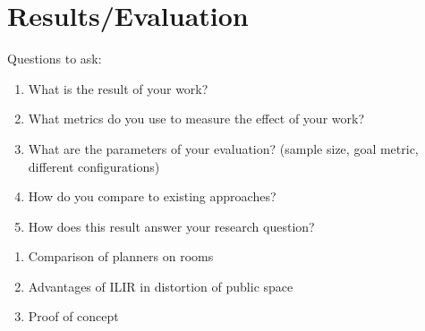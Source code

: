 \chapter{Results/Evaluation}
\label{sec:results}
Questions to ask:
\begin{enumerate}
    \item What is the result of your work?
    \item What metrics do you use to measure the effect of your work?
    \item What are the parameters of your evaluation? (sample size, goal metric, different configurations)
    \item How do you compare to existing approaches?
    \item How does this result answer your research question?
\end{enumerate}

\begin{enumerate}
    \item Comparison of planners on rooms
    \item Advantages of ILIR in distortion of public space
    \item Proof of concept 
\end{enumerate}